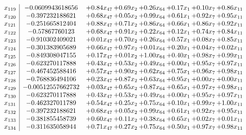 \documentclass[8pt]{article}
\begin{document}
\[\begin{array}{c| c c@{\hskip 2pt} c@{\hskip 2pt} c@{\hskip 2pt} c@{\hskip 2pt} c@{\hskip 2pt} c@{\hskip 2pt} }
 x_{119}   &  -0.0609943618656 & +  0.84 x_{47} & +  0.69 x_{2} & +  0.26 x_{64} & +  0.17 x_{1} & +  0.10 x_{7} & +  0.86 x_{11}\\
 x_{120}   &  -0.397232188621 & +  0.68 x_{47} & +  0.05 x_{2} & +  0.99 x_{64} & +  0.61 x_{1} & +  0.92 x_{7} & +  0.95 x_{11}\\
 x_{121}   &  -0.251665812404 & +  0.88 x_{47} & +  0.71 x_{2} & +  0.86 x_{64} & +  0.66 x_{1} & +  0.86 x_{7} & +  0.92 x_{11}\\
 x_{122}   &  -0.57867760123 & +  0.68 x_{47} & +  0.91 x_{2} & +  0.22 x_{64} & +  0.12 x_{1} & +  0.74 x_{7} & +  0.84 x_{11}\\
 x_{123}   &  -0.910302409021 & +  0.01 x_{47} & +  0.70 x_{2} & +  0.26 x_{64} & +  0.57 x_{1} & +  0.08 x_{7} & +  0.85 x_{11}\\
 x_{124}   &  -0.301383905689 & +  0.66 x_{47} & +  0.97 x_{2} & +  0.01 x_{64} & +  0.20 x_{1} & +  0.04 x_{7} & +  0.02 x_{11}\\
 x_{125}   &  -0.849308047155 & +  0.17 x_{47} & +  0.01 x_{2} & +  1.00 x_{64} & +  0.40 x_{1} & +  0.98 x_{7} & +  0.99 x_{11}\\
 x_{126}   &  -0.623270117888 & +  0.43 x_{47} & +  0.53 x_{2} & +  0.49 x_{64} & +  0.00 x_{1} & +  0.95 x_{7} & +  0.97 x_{11}\\
 x_{127}   &  -0.467452588416 & +  0.57 x_{47} & +  0.90 x_{2} & +  0.62 x_{64} & +  0.75 x_{1} & +  0.96 x_{7} & +  0.98 x_{11}\\
 x_{128}   &  -0.768836494106 & +  0.23 x_{47} & +  0.87 x_{2} & +  0.63 x_{64} & +  0.95 x_{1} & +  0.00 x_{7} & +  0.00 x_{11}\\
 x_{129}   &  -0.00512557662732 & +  0.03 x_{47} & +  0.65 x_{2} & +  0.87 x_{64} & +  0.65 x_{1} & +  0.97 x_{7} & +  0.98 x_{11}\\
 x_{130}   &  -0.623270117888 & +  0.43 x_{47} & +  0.53 x_{2} & +  0.49 x_{64} & +  0.00 x_{1} & +  0.95 x_{7} & +  0.97 x_{11}\\
 x_{131}   &  -0.462327011789 & +  0.54 x_{47} & +  0.25 x_{2} & +  0.75 x_{64} & +  0.10 x_{1} & +  0.99 x_{7} & +  1.00 x_{11}\\
 x_{132}   &  -0.397232188621 & +  0.68 x_{47} & +  0.05 x_{2} & +  0.99 x_{64} & +  0.61 x_{1} & +  0.92 x_{7} & +  0.95 x_{11}\\
 x_{133}   &  -0.381855458739 & +  0.60 x_{47} & +  0.11 x_{2} & +  0.38 x_{64} & +  0.65 x_{1} & +  0.02 x_{7} & +  0.01 x_{11}\\
 x_{134}   &  -0.311635058944 & +  0.71 x_{47} & +  0.27 x_{2} & +  0.75 x_{64} & +  0.50 x_{1} & +  0.97 x_{7} & +  0.98 x_{11}\\

\end{array}\]
\end{document}
